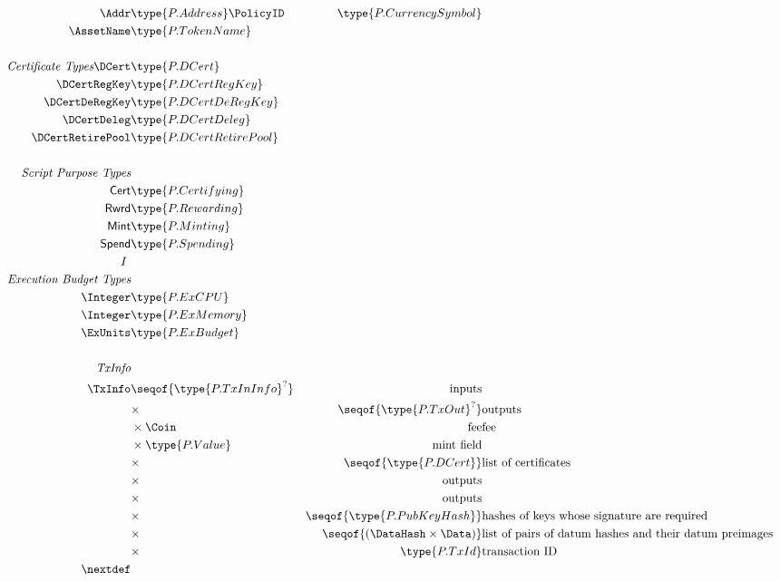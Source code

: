 \begin{figure*}[htb]
\begin{align*}
    \Addr  & \type{P.Address}
    \PolicyID & \type{P.CurrencySymbol} \\
    \AssetName & \type{P.TokenName} \\
    ~\\
    \emph{Certificate Types}
    \DCert & \type{P.DCert} \\
    \DCertRegKey & \type{P.DCertRegKey} \\
    \DCertDeRegKey & \type{P.DCertDeRegKey} \\
    \DCertDeleg & \type{P.DCertDeleg} \\
    \DCertRetirePool & \type{P.DCertRetirePool} \\
    ~\\
    \emph{Script Purpose Types} \\
    \mathsf{Cert}  & \type{P.Certifying} \\
    \mathsf{Rwrd} & \type{P.Rewarding} \\
    \mathsf{Mint} & \type{P.Minting} \\
    \mathsf{Spend} & \type{P.Spending} \\I
    ~\\
    \emph{Execution Budget Types} \\
    \Integer & \type{P.ExCPU} \\
    \Integer  & \type{P.ExMemory}\\
    \ExUnits & \type{P.ExBudget}  \\
    ~\\
    \emph{TxInfo} \\
    \TxInfo & \seqof{ \type{P.TxInInfo}^? } & \text{inputs} \\ %
      & \times & \seqof {\type{P.TxOut}^?} & \text{outputs} \\ %
      & \times  \Coin & \text{fee} & \text{fee} \\ %
      & \times \type{P.Value} & \text{mint field} \\ %
      & \times & \seqof{\type{P.DCert}} & \text{list of certificates} \\ %
      & \times & \text{outputs} \\ %
      & \times & \text{outputs} \\ %
      & \times & \seqof{\type{P.PubKeyHash}} & \text{hashes of keys whose signature are required} \\ %
      & \times & \seqof{(\DataHash \times \Data)} & \text{list of pairs of datum hashes and their datum preimages} \\ %
      & \times  & \type{P.TxId} & \text{transaction ID} \\ %
    \nextdef



\end{align*}
\end{figure*}
